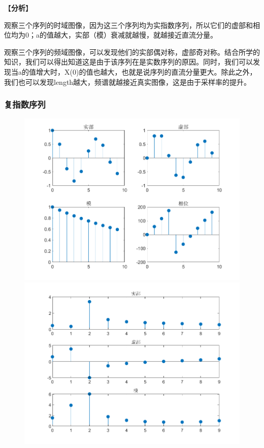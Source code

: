 \documentclass{../source/zjureport}
\begin{document}
                【\textbf{分析}】
                
                观察三个序列的时域图像，因为这三个序列均为实指数序列，所以它们的虚部和相位均为0；a的值越大，实部（模）衰减就越慢，就越接近直流分量。

                观察三个序列的频域图像，可以发现他们的实部偶对称，虚部奇对称。结合所学的知识，我们可以得出知道这是由于该序列在是实数序列的原因。同时，我们可以发现当a的值增大时，X(0)的值也越大，也就是说序列的直流分量更大。除此之外，我们也可以发现length越大，频谱就越接近真实图像，这是由于采样率的提升。
            
            \subsubsection{复指数序列}
                \begin{figure}[H]
                    \centering
                    \begin{minipage}[t]{0.48\textwidth}
                    \centering
                    \includegraphics[width=\textwidth]{figure/复指数序列.png}
                    \end{minipage}
                    \begin{minipage}[t]{0.48\textwidth}
                    \centering
                    \includegraphics[width=\textwidth]{figure/频谱_复指数序列.png}

\end{minipage}
\end{figure}
\end{document}
